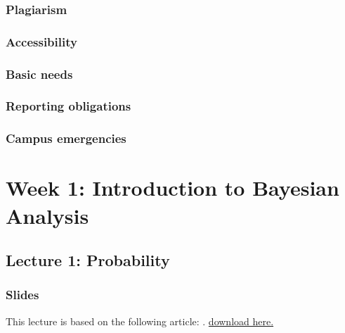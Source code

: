 \documentclass[
]{book}
\begin{document}
\subsection{Plagiarism}\label{plagiarism}

\subsection{Accessibility}\label{accessibility}

\subsection{Basic needs}\label{basic-needs}

\subsection{Reporting obligations}\label{reporting-obligations}

\subsection{Campus emergencies}\label{campus-emergencies}

\chapter{Week 1: Introduction to Bayesian Analysis}\label{week-1-introduction-to-bayesian-analysis}

\section{Lecture 1: Probability}\label{lecture-1-probability}

\subsection{Slides}\label{slides}

This lecture is based on the following article: \citet{etz_introduction_2018-1}. \href{readings/Etz\%20and\%20Vandekerckhove\%20-\%202018\%20-\%20Introduction\%20to\%20Bayesian\%20Inference\%20for\%20Psychology.pdf}{download here.}


\end{document}
